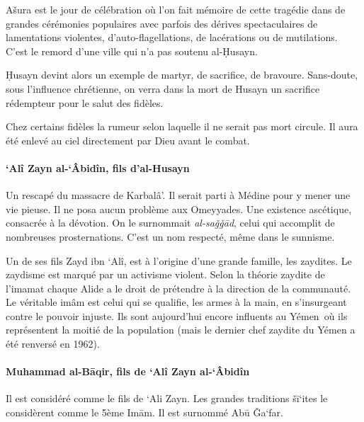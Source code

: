 Ašura est le jour de célébration où l'on fait mémoire de cette tragédie
dans de grandes cérémonies populaires avec parfois des dérives
spectaculaires de lamentations violentes, d'auto-flagellations, de
lacérations ou de mutilations. C'est le remord d'une ville qui n'a pas
soutenu al-Ḥusayn.

Ḥusayn devint alors un exemple de martyr, de sacrifice, de bravoure.
Sans-doute, sous l'influence chrétienne, on verra dans la mort de Husayn
un sacrifice rédempteur pour le salut des fidèles.

Chez certains fidèles la rumeur selon laquelle il ne serait pas mort
circule. Il aura été enlevé au ciel directement par Dieu avant le
combat.




 
\paragraph{`Alî Zayn al-`Âbidîn, fils
d'al-Husayn}\label{aluxee-zayn-al-uxe2biduxeen-fils-dal-husayn}

Un rescapé du massacre de Karbalâ'. Il serait parti à Médine pour y
mener une vie pieuse. Il ne posa aucun problème aux Omeyyades. Une
existence ascétique, consacrée à la dévotion. On le surnommait
\emph{al-saǧǧād}, celui qui accomplit de nombreuses prosternations.
C'est un nom respecté, même dans le sunnisme.

Un de ses fils Zayd ibn `Alî, est à l'origine d'une grande famille, les
zaydites. Le zaydisme est marqué par un activisme violent. Selon la
théorie zaydite de l'imamat chaque Alide a le droit de prétendre à la
direction de la communauté. Le véritable imâm est celui qui se qualifie,
les armes à la main, en s'insurgeant contre le pouvoir injuste. Ils sont
aujourd'hui encore influents au Yémen~où ils représentent la moitié de
la population (mais le dernier chef zaydite du Yémen a été renversé en
1962).

 
\paragraph{Muhammad al-Bāqir, fils de `Alî Zayn
al-`Âbidîn}\label{muhammad-al-bux101qir-fils-de-aluxee-zayn-al-uxe2biduxeen}

Il est considéré comme le fils de `Ali Zayn. Les grandes traditions
šī`ites le considèrent comme le 5ème Imām. Il est surnommé Abū Ǧa`far.

